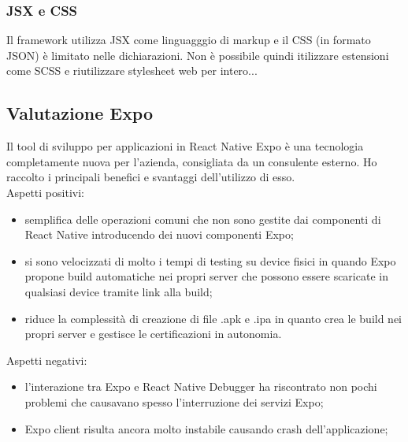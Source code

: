 \subsubsection{JSX e CSS}
Il framework utilizza JSX come linguagggio di markup e il CSS (in formato JSON) è limitato nelle dichiarazioni. Non è possibile quindi itilizzare estensioni come SCSS e riutilizzare stylesheet web per intero...

\subsection{Valutazione Expo}
Il tool di sviluppo per applicazioni in React Native Expo è una tecnologia completamente nuova per l'azienda, consigliata da un consulente esterno. Ho raccolto i principali benefici e svantaggi dell'utilizzo di esso.\\
Aspetti positivi:
\begin{itemize}
	\item semplifica delle operazioni comuni che non sono gestite dai componenti di React Native introducendo dei nuovi componenti Expo;
	\item si sono velocizzati di molto i tempi di testing su device fisici in quando Expo propone build automatiche nei propri server che possono essere scaricate in qualsiasi device tramite link alla build;
	\item riduce la complessità di creazione di file .apk e .ipa in quanto crea le build nei propri server e gestisce le certificazioni in autonomia.
\end{itemize}
Aspetti negativi:
\begin{itemize}
	\item l'interazione tra Expo e React Native Debugger ha riscontrato non pochi problemi che causavano spesso l'interruzione dei servizi Expo;
	\item Expo client risulta ancora molto instabile causando crash dell'applicazione;
\end{itemize}

